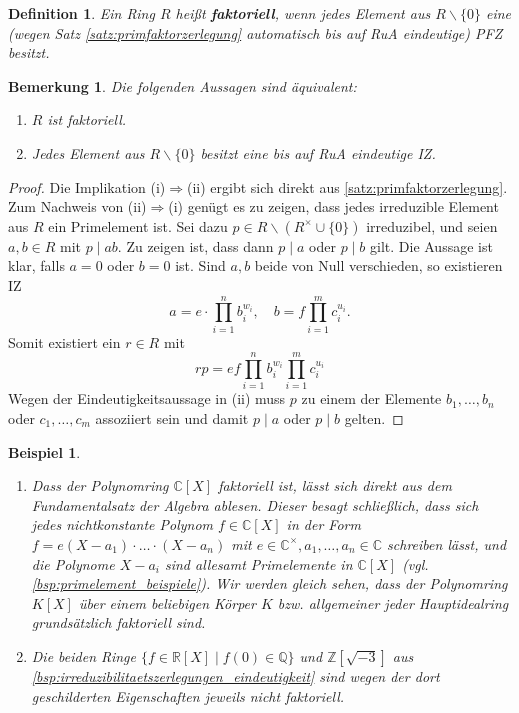\documentclass[a4paper, twoside, 11pt, ngerman]{report}
\newcommand{\CC}{\mathds C}
\newcommand{\QQ}{\mathds Q}
\newcommand{\RR}{\mathds R}
\newcommand{\ZZ}{\mathds Z}
\renewcommand{\setminus}{\smallsetminus}
\theoremstyle{definistyle}
\newtheorem{defini}[satz]{Definition}
\newtheorem{bem}[satz]{Bemerkung}
\newtheorem{bsp}[satz]{Beispiel}
\theoremstyle{remark}
\newcommand{\defn}[1]{\textit{\bfseries #1}}
\begin{document}
\begin{defini}\label{def:faktorieller_ring}
Ein Ring $R$ heißt \defn{faktoriell}, wenn jedes Element aus $R\setminus\{0\}$ eine
(wegen Satz \ref{satz:primfaktorzerlegung} automatisch bis auf RuA eindeutige) PFZ besitzt.
\end{defini}

\begin{bem}
Die folgenden Aussagen sind äquivalent:
\begin{enumerate}
    \item[(i)] $R$ ist faktoriell.
    \item[(ii)] Jedes Element aus $R \setminus \{0\}$ besitzt eine bis auf RuA eindeutige IZ.
\end{enumerate}
\end{bem}
\begin{proof}
Die Implikation (i)$\Rightarrow$(ii) ergibt sich direkt aus \ref{satz:primfaktorzerlegung}.
Zum Nachweis von (ii)$\Rightarrow$(i) genügt es zu zeigen, dass jedes irreduzible Element aus
$R$ ein Primelement ist. Sei dazu $p\in R\setminus(R^\times\cup\{0\})$ irreduzibel, und
seien $a,b\in R$ mit $p\mid ab$. Zu zeigen ist, dass dann $p\mid a$ oder $p\mid b$ gilt.
Die Aussage ist klar, falls $a=0$ oder $b=0$ ist. Sind $a,b$ beide von Null verschieden, so existieren IZ
\[
a=e \cdot \prod_{i=1}^n b_i^{w_i}, \quad b=f\prod_{i=1}^m c_i^{u_i}.
\]
Somit existiert ein $r\in R$ mit
\[
rp= ef \prod_{i=1}^n b_i^{w_i}\prod_{i=1}^m c_i^{u_i}
\]
Wegen der Eindeutigkeitsaussage in (ii) muss $p$ zu einem der Elemente $b_1,\ldots,b_n$
oder $c_1,\ldots,c_m$ assoziiert sein und damit $p\mid a$ oder $p\mid b$ gelten.    
\end{proof}

\begin{bsp}
\begin{enumerate}
\item[(a)] Dass der Polynomring $\CC[X]$ faktoriell ist, lässt sich direkt aus dem Fundamentalsatz der Algebra ablesen. Dieser besagt schließlich, dass sich jedes nichtkonstante Polynom $f\in\CC[X]$
in der Form $f=e(X-a_1)\cdot\ldots\cdot(X-a_n)$ mit $e\in\CC^\times,a_1,\ldots,a_n\in\CC$ schreiben lässt, und die Polynome $X-a_i$ sind allesamt Primelemente in $\CC[X]$ (vgl. \ref{bsp:primelement_beispiele}). Wir werden gleich sehen, dass der Polynomring $K[X]$ über einem beliebigen Körper $K$ bzw. allgemeiner jeder Hauptidealring grundsätzlich faktoriell sind.
\item[(b)] Die beiden Ringe $\{f \in \RR[X] \mid f(0) \in \QQ\}$ und $\ZZ[\sqrt{-3}]$
aus \ref{bsp:irreduzibilitaetszerlegungen_eindeutigkeit} sind wegen der dort geschilderten Eigenschaften jeweils nicht faktoriell.
\end{enumerate}
\end{bsp}
\end{document}
